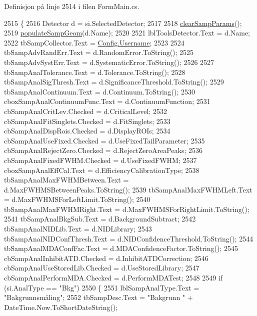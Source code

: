 Definisjon på linje 2514 i filen Form\+Main.\+cs.


\begin{DoxyCode}
2515         \{
2516             Detector d = si.SelectedDetector;
2517 
2518             \hyperlink{class_scintilab_1_1_form_main_a01c213a0d1456773b92d4d431a9d1cdb}{clearSampParams}();
2519             \hyperlink{class_scintilab_1_1_form_main_ace8f1fb51afa44804deec60a6dc42bcb}{populateSampGeom}(d.Name);
2520 
2521             lblToolsDetector.Text = d.Name;
2522             tbSampCollector.Text = \hyperlink{class_scintilab_1_1_config_a46bec74f1139be16639b257d38580f22}{Config.Username};
2523 
2524             tbSampAdvRandErr.Text = d.RandomError.ToString();
2525             tbSampAdvSystErr.Text = d.SystematicError.ToString();
2526 
2527             tbSampAnalTolerance.Text = d.Tolerance.ToString();
2528             tbSampAnalSigThresh.Text = d.SignificanceThreshold.ToString();
2529             tbSampAnalContinuum.Text = d.Continuum.ToString();
2530             cboxSampAnalContinuumFunc.Text = d.ContinuumFunction;
2531             cbSampAnalCritLev.Checked = d.CriticalLevel;
2532             cbSampAnalFitSinglets.Checked = d.FitSinglets;
2533             cbSampAnalDispRois.Checked = d.DisplayROIs;
2534             cbSampAnalUseFixed.Checked = d.UseFixedTailParameter;
2535             cbSampAnalRejectZero.Checked = d.RejectZeroAreaPeaks;
2536             cbSampAnalFixedFWHM.Checked = d.UseFixedFWHM;
2537             cboxSampAnalEffCal.Text = d.EfficiencyCalibrationType;
2538             tbSampAnalMaxFWHMBetween.Text = d.MaxFWHMSBetweenPeaks.ToString();
2539             tbSampAnalMaxFWHMLeft.Text = d.MaxFWHMSForLeftLimit.ToString();
2540             tbSampAnalMaxFWHMRight.Text = d.MaxFWHMSForRightLimit.ToString();
2541             tbSampAnalBkgSub.Text = d.BackgroundSubtract;
2542             tbSampAnalNIDLib.Text = d.NIDLibrary;
2543             tbSampAnalNIDConfThresh.Text = d.NIDConfidenceThreshold.ToString();
2544             tbSampAnalMDAConfFac.Text = d.MDAConfidenceFactor.ToString();
2545             cbSampAnalInhibitATD.Checked = d.InhibitATDCorrection;
2546             cbSampAnalUseStoredLib.Checked = d.UseStoredLibrary;
2547             cbSampAnalPerformMDA.Checked = d.PerformMDATest;
2548 
2549             \textcolor{keywordflow}{if} (si.AnalType == \textcolor{stringliteral}{"Bkg"})
2550             \{
2551                 lblSampAnalType.Text = \textcolor{stringliteral}{"Bakgrunnsmåling"};
2552                 tbSampDesc.Text = \textcolor{stringliteral}{"Bakgrunn "} + DateTime.Now.ToShortDateString();

\end{DoxyCode}
